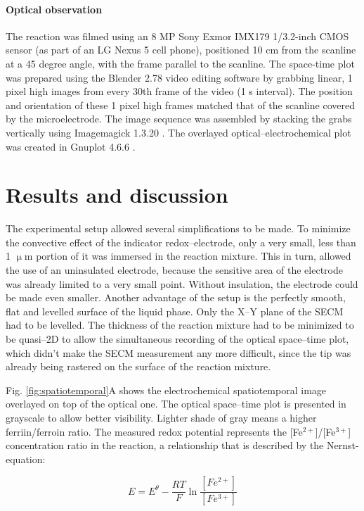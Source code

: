 \documentclass[3p]{elsarticle}
\begin{document}
\paragraph{Optical observation}
The reaction was filmed using an 8 MP Sony Exmor IMX179 1/3.2-inch CMOS sensor (as part of an LG Nexus 5 cell phone), positioned 10 cm from the scanline at a 45 degree angle, with the frame parallel to the scanline.
The space-time plot was prepared using the Blender 2.78 video editing software \cite{blender1} by grabbing linear, 1 pixel high images from every 30th frame of the video (1 s interval).
The position and orientation of these 1 pixel high frames matched that of the scanline covered by the microelectrode.
The image sequence was assembled by stacking the grabs vertically using Imagemagick 1.3.20 \cite{imagemagick}.
The overlayed optical--electrochemical plot was created in Gnuplot 4.6.6 \cite{gnuplot}.

\section{Results and discussion}

The experimental setup allowed several simplifications to be made. To minimize the convective effect of the indicator redox--electrode, only a very small, less than 1 $\upmu$m  portion of it was immersed in the reaction mixture. This in turn, allowed the use of an uninsulated electrode, because the sensitive area of the electrode was already limited to a very small point. Without insulation, the electrode could be made even smaller. Another advantage of the setup is the perfectly smooth, flat and levelled surface of the liquid phase. Only the X--Y plane of the SECM had to be levelled. The thickness of the reaction mixture had to be minimized to be quasi--2D to allow the simultaneous recording of the optical space--time plot, which didn't make the SECM measurement any more difficult, since the tip was already being rastered on the surface of the reaction mixture. 

Fig. \ref{fig:spatiotemporal}A shows the electrochemical spatiotemporal image overlayed on top of the optical one.
The optical space--time plot is presented in grayscale to allow better visibility.
Lighter shade of gray means a higher ferriin/ferroin  ratio.
The measured redox potential represents the [Fe$^{2+}$]/[Fe$^{3+}$]  concentration ratio in the reaction, a relationship that is described by the Nernst-equation:

\begin{equation}
	E = E^\theta - \frac{RT}{F}\ln \frac{[Fe^{2+}]}{[Fe^{3+}]}
\end{equation}
\end{document}
